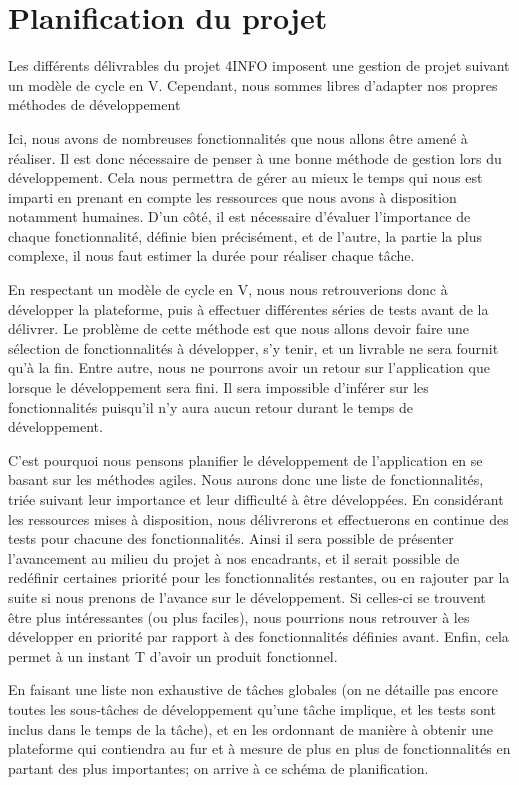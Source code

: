 \section{Planification du projet}
\label{sec:orga}

	Les différents délivrables du projet 4INFO imposent une gestion de projet suivant un modèle de cycle en V. Cependant, nous sommes libres d'adapter nos propres méthodes de développement 

	Ici, nous avons de nombreuses fonctionnalités que nous allons être amené à réaliser. Il est donc nécessaire de penser à une bonne méthode de gestion lors du développement. Cela nous permettra de gérer au mieux le temps qui nous est imparti en prenant en compte les ressources que nous avons à disposition notamment humaines. D'un côté, il est nécessaire d'évaluer l'importance de chaque fonctionnalité, définie bien précisément, et de l'autre, la partie la plus complexe, il nous faut estimer la durée pour réaliser chaque tâche.

	En respectant un modèle de cycle en V, nous nous retrouverions donc à développer la plateforme, puis à effectuer différentes séries de tests avant de la délivrer. Le problème de cette méthode est que nous allons devoir faire une sélection de fonctionnalités à développer, s'y tenir, et un livrable ne sera fournit qu'à la fin. Entre autre, nous ne pourrons avoir un retour sur l'application que lorsque le développement sera fini. Il sera impossible d'inférer sur les fonctionnalités puisqu'il n'y aura aucun retour durant le temps de développement. 

	C'est pourquoi nous pensons planifier le développement de l'application en se basant sur les méthodes agiles. Nous aurons donc une liste de fonctionnalités, triée suivant leur importance et leur difficulté à être développées. En considérant les ressources mises à disposition, nous délivrerons et effectuerons en continue des tests pour chacune des fonctionnalités. Ainsi il sera possible de présenter l'avancement au milieu du projet à nos encadrants, et il serait possible de redéfinir certaines priorité pour les fonctionnalités restantes, ou en rajouter par la suite si nous prenons de l'avance sur le développement. Si celles-ci se trouvent être plus intéressantes (ou plus faciles), nous pourrions nous retrouver à les développer en priorité par rapport à des fonctionnalités définies avant. Enfin, cela permet à un instant T d'avoir un produit fonctionnel.

	En faisant une liste non exhaustive de tâches globales (on ne détaille pas encore toutes les sous-tâches de développement qu'une tâche implique, et les tests sont inclus dans le temps de la tâche), et en les ordonnant de manière à obtenir une plateforme qui contiendra au fur et à mesure de plus en plus de fonctionnalités en partant des plus importantes; on arrive à ce schéma de planification.

